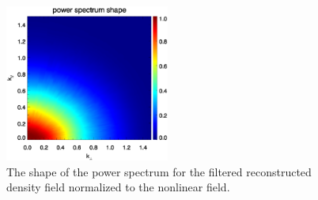 \documentclass[aps,prx,twocolumn,superscriptaddress,groupedaddress,nofootinbib,amsfont]{revtex4}  %
\begin{document}
\begin{figure}[tbp]
\begin{center}
\includegraphics[width=0.48\textwidth]{0.000anishape_deltaRs-tfxEs_4x.eps}
\end{center}
\vspace{-0.7cm}
\caption{The shape of the power spectrum for the filtered reconstructed density
    field normalized to the nonlinear field.}
\label{fig:shape_Es}
\end{figure}
\end{document}
